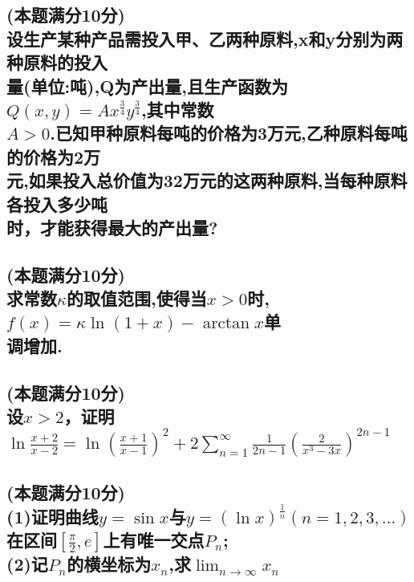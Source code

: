 \documentclass[utf8]{ctexart}
\begin{document}
\subsection{
	(本题满分10分)\\
	设生产某种产品需投入甲、乙两种原料,x和y分别为两种原料的投入\\
	量(单位:吨),Q为产出量,且生产函数为$Q(x,y)=Ax^{\frac{3}{4}}y^{\frac{3}{4}}$,其中常数\\
	$A>0$.已知甲种原料每吨的价格为3万元,乙种原料每吨的价格为2万\\
	元,如果投入总价值为32万元的这两种原料,当每种原料各投入多少吨\\
	时，才能获得最大的产出量?
}
\subsection{
	(本题满分10分)\\
	求常数$\kappa$的取值范围,使得当$x>0$时,$f(x)=\kappa \ln(1+x) - \arctan{x}$单\\调增加.
}
\subsection{(本题满分10分)\\
设$x>2$，证明\\
$\ln{\frac{x+2}{x-2}}=\ln\left( \frac{x+1}{x-1} \right)^2 + 2\displaystyle\sum_{n=1}^{\infty}\frac{1}{2n-1} \left( \frac{2}{x^3-3x} \right)^{2n-1}$
}
\subsection{(本题满分10分)\\
(1)证明曲线$y=\sin{x}$与$y=(\ln{x})^{\frac{1}{n}}(n=1,2,3,\dots)$在区间$\left[ \frac{\pi}{2},e \right]$上有唯一交点$P_n$;\\
(2)记$P_n$的横坐标为$x_n$,求$\displaystyle\lim_{n \rightarrow \infty}{x_n}$
}
\end{document}
